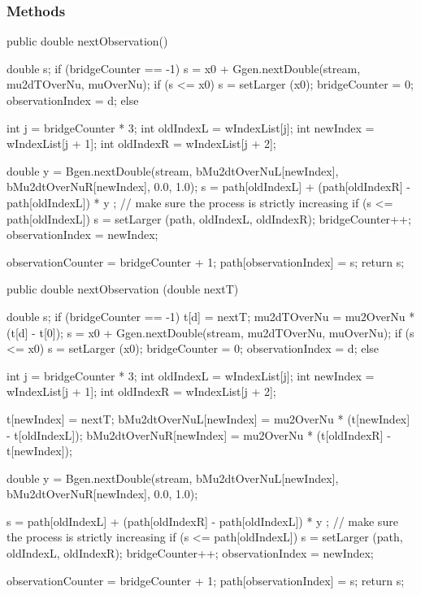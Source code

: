 \subsubsection* {Methods}
\begin{code}\begin{hide}

   public double nextObservation()  {
        double s;
        if (bridgeCounter == -1) {
            s = x0 + Ggen.nextDouble(stream, mu2dTOverNu, muOverNu);
            if (s <= x0)
                s = setLarger (x0);
            bridgeCounter    = 0;
            observationIndex = d;
        } else {
            int j = bridgeCounter * 3;
            int oldIndexL = wIndexList[j];
            int newIndex  = wIndexList[j + 1];
            int oldIndexR = wIndexList[j + 2];

            double y =  Bgen.nextDouble(stream, bMu2dtOverNuL[newIndex],
                                         bMu2dtOverNuR[newIndex], 0.0, 1.0);
            s = path[oldIndexL] +
              (path[oldIndexR] - path[oldIndexL]) * y ;
           // make sure the process is strictly increasing
           if (s <= path[oldIndexL])
               s = setLarger (path, oldIndexL, oldIndexR);
            bridgeCounter++;
            observationIndex = newIndex;
        }
        observationCounter = bridgeCounter + 1;
        path[observationIndex] = s;
        return s;
    }

   public double nextObservation (double nextT) {
        double s;
        if (bridgeCounter == -1) {
            t[d] = nextT;
            mu2dTOverNu = mu2OverNu * (t[d] - t[0]);
            s = x0 + Ggen.nextDouble(stream, mu2dTOverNu, muOverNu);
            if (s <= x0)
                s = setLarger (x0);
            bridgeCounter    = 0;
            observationIndex = d;
        } else {
            int j = bridgeCounter * 3;
            int oldIndexL = wIndexList[j];
            int newIndex  = wIndexList[j + 1];
            int oldIndexR = wIndexList[j + 2];

            t[newIndex] = nextT;
            bMu2dtOverNuL[newIndex] = mu2OverNu
                                      * (t[newIndex] - t[oldIndexL]);
            bMu2dtOverNuR[newIndex] = mu2OverNu
                              * (t[oldIndexR] - t[newIndex]);

            double y = Bgen.nextDouble(stream, bMu2dtOverNuL[newIndex],
                                         bMu2dtOverNuR[newIndex], 0.0, 1.0);

            s = path[oldIndexL] +
              (path[oldIndexR] - path[oldIndexL]) * y ;
            // make sure the process is strictly increasing
            if (s <= path[oldIndexL])
               s = setLarger (path, oldIndexL, oldIndexR);
            bridgeCounter++;
            observationIndex = newIndex;
        }
        observationCounter = bridgeCounter + 1;
        path[observationIndex] = s;
        return s;
    }


\end{hide}
\end{code}

